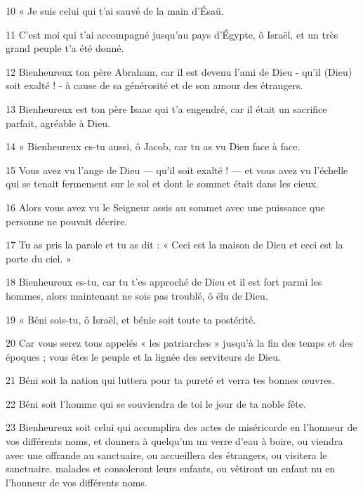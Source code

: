 \par 10 « Je suis celui qui t'ai sauvé de la main d'Ésaü.

\par 11 C'est moi qui t'ai accompagné jusqu'au pays d'Égypte, ô Israël, et un très grand peuple t'a été donné.

\par 12 Bienheureux ton père Abraham, car il est devenu l'ami de Dieu - qu'il (Dieu) soit exalté ! - à cause de sa générosité et de son amour des étrangers.

\par 13 Bienheureux est ton père Isaac qui t'a engendré, car il était un sacrifice parfait, agréable à Dieu.

\par 14 « Bienheureux es-tu aussi, ô Jacob, car tu as vu Dieu face à face.

\par 15 Vous avez vu l'ange de Dieu — qu'il soit exalté ! — et vous avez vu l'échelle qui se tenait fermement sur le sol et dont le sommet était dans les cieux.

\par 16 Alors vous avez vu le Seigneur assis au sommet avec une puissance que personne ne pouvait décrire.

\par 17 Tu as pris la parole et tu as dit : « Ceci est la maison de Dieu et ceci est la porte du ciel. »

\par 18 Bienheureux es-tu, car tu t'es approché de Dieu et il est fort parmi les hommes, alors maintenant ne sois pas troublé, ô élu de Dieu.

\par 19 « Béni sois-tu, ô Israël, et bénie soit toute ta postérité.

\par 20 Car vous serez tous appelés « les patriarches » jusqu'à la fin des temps et des époques ; vous êtes le peuple et la lignée des serviteurs de Dieu.

\par 21 Béni soit la nation qui luttera pour ta pureté et verra tes bonnes œuvres.

\par 22 Béni soit l'homme qui se souviendra de toi le jour de ta noble fête.

\par 23 Bienheureux soit celui qui accomplira des actes de miséricorde en l'honneur de vos différents noms, et donnera à quelqu'un un verre d'eau à boire, ou viendra avec une offrande au sanctuaire, ou accueillera des étrangers, ou visitera le sanctuaire. malades et consoleront leurs enfants, ou vêtiront un enfant nu en l'honneur de vos différents noms.

